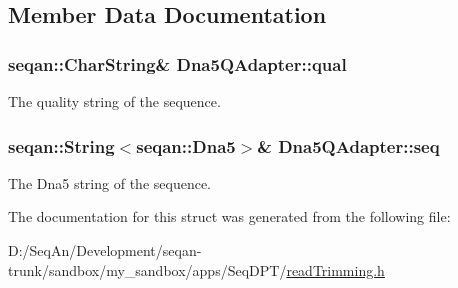 \subsection{Member Data Documentation}
\hypertarget{struct_dna5_q_adapter_a760457b486ea989ec95958e78f7dff9f}{
\subsubsection[{qual}]{\setlength{\rightskip}{0pt plus 5cm}seqan\-::\-Char\-String\& Dna5\-Q\-Adapter\-::qual}}\label{struct_dna5_q_adapter_a760457b486ea989ec95958e78f7dff9f}
The quality string of the sequence. \hypertarget{struct_dna5_q_adapter_adbb31f790426215e45b4816c48e0e671}{
\subsubsection[{seq}]{\setlength{\rightskip}{0pt plus 5cm}seqan\-::\-String$<$seqan\-::\-Dna5$>$\& Dna5\-Q\-Adapter\-::seq}}\label{struct_dna5_q_adapter_adbb31f790426215e45b4816c48e0e671}
The Dna5 string of the sequence. 

The documentation for this struct was generated from the following file\-:\begin{DoxyCompactItemize}
\item 
D\-:/\-Seq\-An/\-Development/seqan-\/trunk/sandbox/my\-\_\-sandbox/apps/\-Seq\-D\-P\-T/\hyperlink{read_trimming_8h}{read\-Trimming.\-h}\end{DoxyCompactItemize}
